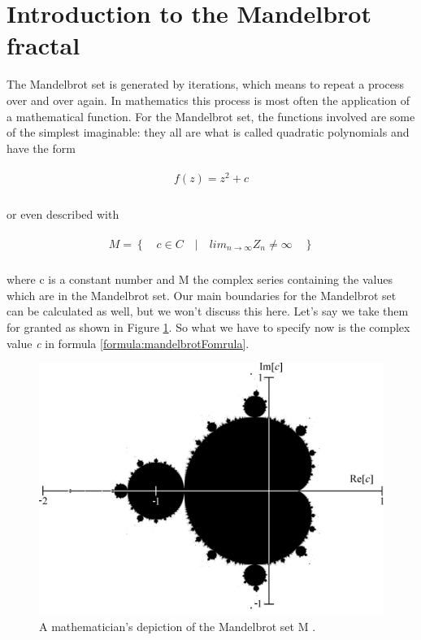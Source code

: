 \newpage

\section{Introduction to the Mandelbrot fractal} \label{chap:mandelbrotIntroduction}
The Mandelbrot set is generated by iterations, which means to repeat a process over and over again. In mathematics this process is most often the application of a mathematical function.
For the Mandelbrot set, the functions involved are some of the simplest imaginable: they all are what is called quadratic polynomials and have the form 

\begin{align} \label{formula:mandelbrotFomrula}
	\begin{aligned}
		f(z) = z^2 + c
	\end{aligned}
\end{align}\\

or even described with

\begin{align} \label{formula:mandelbrotFomrula2}
	\begin{aligned}
		M = \left\lbrace \quad c \in C \quad | \quad lim_{n \rightarrow \infty} Z_n \neq \infty \quad \right\rbrace  
	\end{aligned}
\end{align}\\

where c is a constant number and M the complex series containing the values which are in the Mandelbrot set. Our main boundaries for the Mandelbrot set can be calculated as well, but we won't discuss this here. Let's say we take them for granted as shown in Figure \ref{fig:mandelbrotSet}. So what we have to specify now is the complex value \textit{c} in formula \ref{formula:mandelbrotFomrula}.

\begin{figure}[htbp]
	\centerline{\includegraphics[width=0.9\linewidth]{images/Mandelset_hires.png}}
	\caption{ A mathematician's depiction of the Mandelbrot set M \parencite{internet14}. }
	\label{fig:mandelbrotSet}
\end{figure}  

